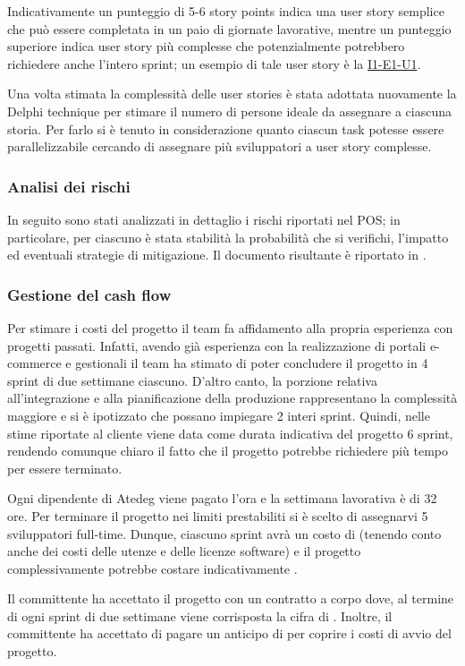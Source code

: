 Indicativamente un punteggio di 5-6 story points indica una user story semplice che può essere completata in un paio di giornate lavorative, mentre un punteggio superiore indica user story più complesse che potenzialmente potrebbero richiedere anche l'intero sprint; un esempio di tale user story è la \href{user-story:i1-e1-u1}{I1-E1-U1}.

Una volta stimata la complessità delle user stories è stata adottata nuovamente la Delphi technique per stimare il numero di persone ideale da assegnare a ciascuna storia. Per farlo si è tenuto in considerazione quanto ciascun task potesse essere parallelizzabile cercando di assegnare più sviluppatori a user story complesse.

\subsubsection{Analisi dei rischi}
In seguito sono stati analizzati in dettaglio i rischi riportati nel POS; in particolare, per ciascuno è stata stabilità la probabilità che si verifichi, l'impatto ed eventuali strategie di mitigazione. Il documento risultante è riportato in .

\subsubsection{Gestione del cash flow}
Per stimare i costi del progetto il team fa affidamento alla propria esperienza con progetti passati. Infatti, avendo già esperienza con la realizzazione di portali e-commerce e gestionali il team ha stimato di poter concludere il progetto in 4 sprint di due settimane ciascuno. D'altro canto, la porzione relativa all'integrazione e alla pianificazione della produzione rappresentano la complessità maggiore e si è ipotizzato che possano impiegare 2 interi sprint.
Quindi, nelle stime riportate al cliente viene data come durata indicativa del progetto 6 sprint, rendendo comunque chiaro il fatto che il progetto potrebbe richiedere più tempo per essere terminato.

Ogni dipendente di Atedeg viene pagato  l'ora e la settimana lavorativa è di 32 ore. Per terminare il progetto nei limiti prestabiliti si è scelto di assegnarvi 5 sviluppatori full-time. Dunque, ciascuno sprint avrà un costo di  (tenendo conto anche dei costi delle utenze e delle licenze software) e il progetto complessivamente potrebbe costare indicativamente .

Il committente ha accettato il progetto con un contratto a corpo dove, al termine di ogni sprint di due settimane viene corrisposta la cifra di .
Inoltre, il committente ha accettato di pagare un anticipo di  per coprire i costi di avvio del progetto.
